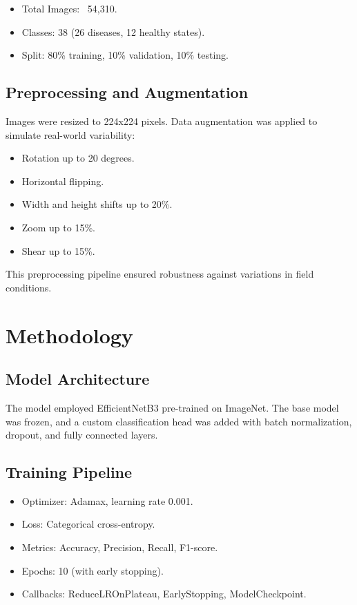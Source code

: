 \documentclass[12pt,a4paper]{report}
\begin{document}
\begin{List of Abbreviations}
\begin{itemize}
    \item Total Images: ~54,310.
    \item Classes: 38 (26 diseases, 12 healthy states).
    \item Split: 80\% training, 10\% validation, 10\% testing.
\end{itemize}

\section{Preprocessing and Augmentation}
Images were resized to 224x224 pixels. Data augmentation was applied to simulate real-world variability:
\begin{itemize}
    \item Rotation up to 20 degrees.
    \item Horizontal flipping.
    \item Width and height shifts up to 20\%.
    \item Zoom up to 15\%.
    \item Shear up to 15\%.
\end{itemize}

This preprocessing pipeline ensured robustness against variations in field conditions.

\chapter{Methodology}
\section{Model Architecture}
The model employed EfficientNetB3 pre-trained on ImageNet. The base model was frozen, and a custom classification head was added with batch normalization, dropout, and fully connected layers.

\section{Training Pipeline}
\begin{itemize}
    \item Optimizer: Adamax, learning rate 0.001.
    \item Loss: Categorical cross-entropy.
    \item Metrics: Accuracy, Precision, Recall, F1-score.
    \item Epochs: 10 (with early stopping).
    \item Callbacks: ReduceLROnPlateau, EarlyStopping, ModelCheckpoint.
\end{itemize}


\end{List of Abbreviations}
\end{document}
